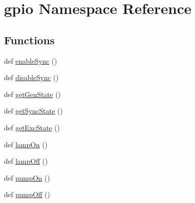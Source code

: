 \hypertarget{namespacegpio}{}\section{gpio Namespace Reference}
\label{namespacegpio}
\subsection*{Functions}
\begin{DoxyCompactItemize}
\item 
def \hyperlink{namespacegpio_ae8837e6d00fbea19d44f7aa926a634ef}{enable\+Sync} ()
\item 
def \hyperlink{namespacegpio_ac1912beec6eeee6ca6b0e62d7f80a3a7}{disable\+Sync} ()
\item 
def \hyperlink{namespacegpio_a8ada6f4c67b4ecad155154eba6f26b91}{get\+Gen\+State} ()
\item 
def \hyperlink{namespacegpio_a9c9f91a0ba0db143b9200a036e9fb52d}{get\+Sync\+State} ()
\item 
def \hyperlink{namespacegpio_afb4dadb975adb3eee123855ec8703314}{get\+Exc\+State} ()
\item 
def \hyperlink{namespacegpio_a5dcd80a4a013b954caedb5318d1e97f4}{lamp\+On} ()
\item 
def \hyperlink{namespacegpio_aff3c5777645844a7f11e1825230c29b4}{lamp\+Off} ()
\item 
def \hyperlink{namespacegpio_aad3cd613f686071fa50120d6038de384}{pump\+On} ()
\item 
def \hyperlink{namespacegpio_a9ca03a388bd950acaf08b0469d9c30d5}{pump\+Off} ()
\end{DoxyCompactItemize}
